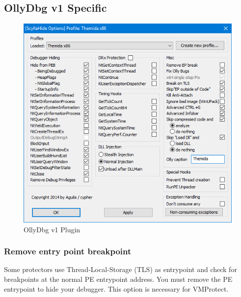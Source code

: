 \documentclass[10pt,a4paper]{article}
\begin{document}
\subsection{OllyDbg v1 Specific}

\begin{figure}[H]
\centering
\includegraphics[scale=1]{ollyv1plugin.PNG}
\caption{OllyDbg v1 Plugin}
\end{figure}

\subsubsection{Remove entry point breakpoint}
Some protectors use Thread-Local-Storage (TLS) as entrypoint and check for breakpoints at the normal PE entrypoint address. You must remove the PE entrypoint to hide your debugger. This option is necessary for VMProtect.
\end{document}
